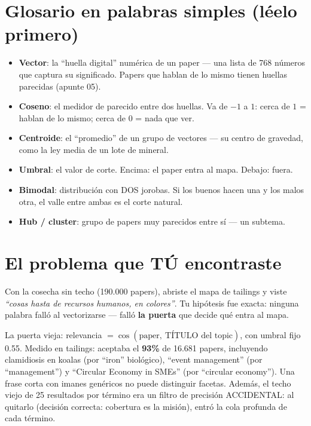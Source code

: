 \documentclass[11pt,a4paper]{article}
\begin{document}

\section{Glosario en palabras simples (léelo primero)}

\begin{itemize}
  \item \textbf{Vector}: la ``huella digital'' numérica de un paper --- una lista de 768
        números que captura su significado. Papers que hablan de lo mismo tienen huellas
        parecidas (apunte 05).
  \item \textbf{Coseno}: el medidor de parecido entre dos huellas. Va de $-1$ a $1$:
        cerca de $1$ = hablan de lo mismo; cerca de $0$ = nada que ver.
  \item \textbf{Centroide}: el ``promedio'' de un grupo de vectores --- su centro de
        gravedad, como la ley media de un lote de mineral.
  \item \textbf{Umbral}: el valor de corte. Encima: el paper entra al mapa. Debajo: fuera.
  \item \textbf{Bimodal}: distribución con DOS jorobas. Si los buenos hacen una y los
        malos otra, el valle entre ambas es el corte natural.
  \item \textbf{Hub / cluster}: grupo de papers muy parecidos entre sí --- un subtema.
\end{itemize}

\section{El problema que TÚ encontraste}

Con la cosecha sin techo (190.000 papers), abriste el mapa de tailings y viste
\emph{``cosas hasta de recursos humanos, en colores''}. Tu hipótesis fue exacta: ninguna
palabra falló al vectorizarse --- falló \textbf{la puerta} que decide qué entra al mapa.

La puerta vieja: relevancia $= \cos(\mbox{paper},\ \mbox{TÍTULO del topic})$, con
umbral fijo 0.55. Medido en tailings: aceptaba el \textbf{93\%} de 16.681 papers,
incluyendo clamidiosis en koalas (por ``iron'' biológico), ``event management'' (por
``management'') y ``Circular Economy in SMEs'' (por ``circular economy''). Una frase
corta con imanes genéricos no puede distinguir facetas. Además, el techo viejo de 25
resultados por término era un filtro de precisión ACCIDENTAL: al quitarlo (decisión
correcta: cobertura es la misión), entró la cola profunda de cada término.
\end{document}
